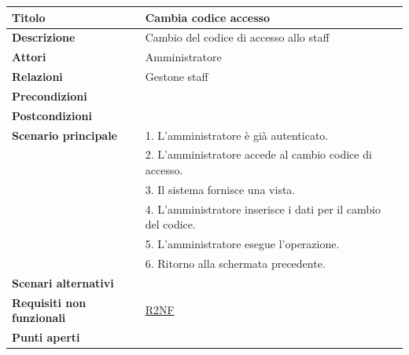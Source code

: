 \documentclass[a4paper]{article}
\begin{document}
\begin{center}
\begin{tabularx}{1\textwidth}{|l|X|}
    \hline
	\textbf{Titolo} & Cambia codice accesso \\
	\hline
	\textbf{Descrizione} & Cambio del codice di accesso allo staff \\
	\hline
	\textbf{Attori} & Amministratore \\
	\hline
	\textbf{Relazioni} & Gestone staff \\
	\hline
	\textbf{Precondizioni} &  \\
	\hline
	\textbf{Postcondizioni} &  \\
	\hline
	\textbf{Scenario principale} & 1. L'amministratore è già autenticato.\\
	                             & 2. L'amministratore accede al cambio codice di accesso. \\
								 & 3. Il sistema fornisce una vista. \\
								 & 4. L'amministratore inserisce i dati per il cambio del codice. \\
								 & 5. L'amministratore esegue l'operazione.\\
								 & 6. Ritorno alla schermata precedente.\\
	\hline
	\textbf{Scenari alternativi} & \\
	\hline
	\textbf{Requisiti non funzionali} & \hyperlink{R2NF}{R2NF} \\
	\hline
	\textbf{Punti aperti} & \\
	\hline
\end{tabularx}
\end{center}

\end{document}
